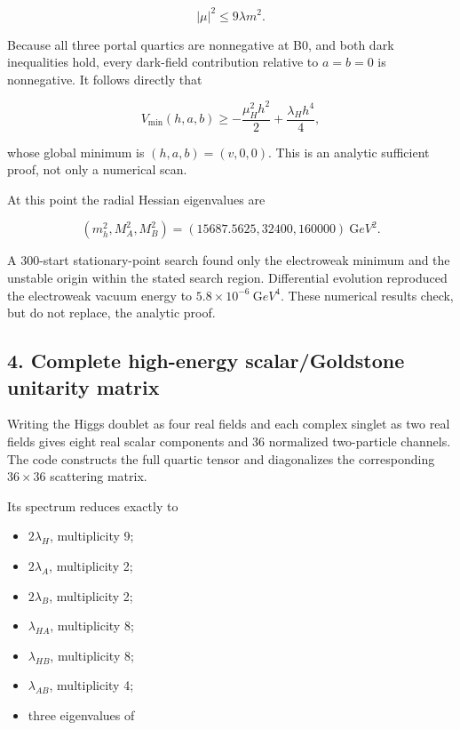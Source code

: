 \documentclass[
]{article}
\providecommand{\tightlist}{%
  \setlength{\itemsep}{0pt}\setlength{\parskip}{0pt}}
\begin{document}
\[
|\mu|^2\le9\lambda m^2.
\]

Because all three portal quartics are nonnegative at B0, and both dark
inequalities hold, every dark-field contribution relative to \(a=b=0\)
is nonnegative. It follows directly that

\[
V_{\min}(h,a,b)\ge -\frac{\mu_H^2h^2}{2}+\frac{\lambda_Hh^4}{4},
\]

whose global minimum is \((h,a,b)=(v,0,0)\). This is an analytic
sufficient proof, not only a numerical scan.

At this point the radial Hessian eigenvalues are

\[
(m_h^2,M_A^2,M_B^2)=(15687.5625,32400,160000)\ {\mathrm GeV}^2.
\]

A 300-start stationary-point search found only the electroweak minimum
and the unstable origin within the stated search region. Differential
evolution reproduced the electroweak vacuum energy to
\(5.8\times10^{-6}\ {\mathrm GeV}^4\). These numerical results check,
but do not replace, the analytic proof.

\hypertarget{complete-high-energy-scalargoldstone-unitarity-matrix}{%
\subsection{4. Complete high-energy scalar/Goldstone unitarity
matrix}\label{complete-high-energy-scalargoldstone-unitarity-matrix}}

Writing the Higgs doublet as four real fields and each complex singlet
as two real fields gives eight real scalar components and 36 normalized
two-particle channels. The code constructs the full quartic tensor and
diagonalizes the corresponding \(36\times36\) scattering matrix.

Its spectrum reduces exactly to

\begin{itemize}
\tightlist
\item
  \(2\lambda_H\), multiplicity 9;
\item
  \(2\lambda_A\), multiplicity 2;
\item
  \(2\lambda_B\), multiplicity 2;
\item
  \(\lambda_{HA}\), multiplicity 8;
\item
  \(\lambda_{HB}\), multiplicity 8;
\item
  \(\lambda_{AB}\), multiplicity 4;
\item
  three eigenvalues of
\end{itemize}
\end{document}
